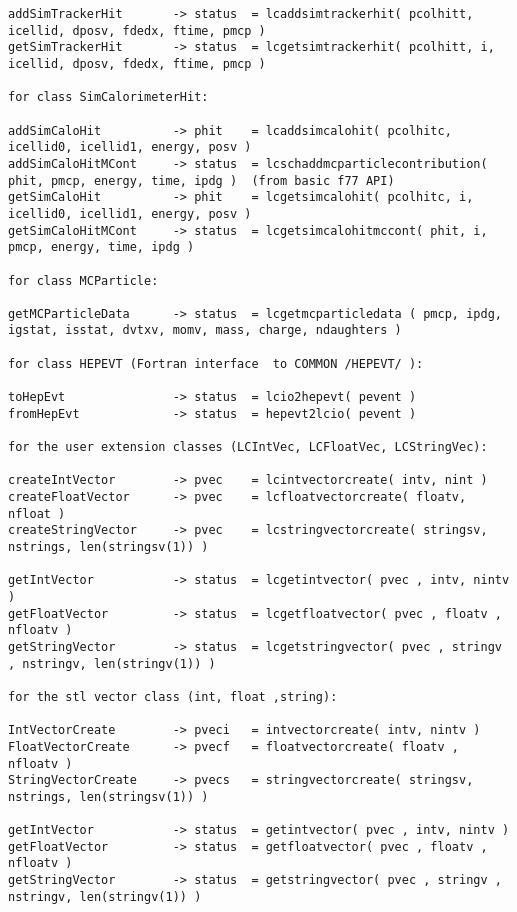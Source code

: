 \begin{scriptsize}
\begin{verbatim}
addSimTrackerHit       -> status  = lcaddsimtrackerhit( pcolhitt, icellid, dposv, fdedx, ftime, pmcp )
getSimTrackerHit       -> status  = lcgetsimtrackerhit( pcolhitt, i, icellid, dposv, fdedx, ftime, pmcp )

for class SimCalorimeterHit:

addSimCaloHit          -> phit    = lcaddsimcalohit( pcolhitc, icellid0, icellid1, energy, posv )
addSimCaloHitMCont     -> status  = lcschaddmcparticlecontribution( phit, pmcp, energy, time, ipdg )  (from basic f77 API)
getSimCaloHit          -> phit    = lcgetsimcalohit( pcolhitc, i, icellid0, icellid1, energy, posv )
getSimCaloHitMCont     -> status  = lcgetsimcalohitmccont( phit, i, pmcp, energy, time, ipdg )

for class MCParticle:

getMCParticleData      -> status  = lcgetmcparticledata ( pmcp, ipdg, igstat, isstat, dvtxv, momv, mass, charge, ndaughters )

for class HEPEVT (Fortran interface  to COMMON /HEPEVT/ ):

toHepEvt               -> status  = lcio2hepevt( pevent )
fromHepEvt             -> status  = hepevt2lcio( pevent )

for the user extension classes (LCIntVec, LCFloatVec, LCStringVec):

createIntVector        -> pvec    = lcintvectorcreate( intv, nint )
createFloatVector      -> pvec    = lcfloatvectorcreate( floatv, nfloat )
createStringVector     -> pvec    = lcstringvectorcreate( stringsv, nstrings, len(stringsv(1)) )

getIntVector           -> status  = lcgetintvector( pvec , intv, nintv )
getFloatVector         -> status  = lcgetfloatvector( pvec , floatv , nfloatv )
getStringVector        -> status  = lcgetstringvector( pvec , stringv , nstringv, len(stringv(1)) )

for the stl vector class (int, float ,string):

IntVectorCreate        -> pveci   = intvectorcreate( intv, nintv )
FloatVectorCreate      -> pvecf   = floatvectorcreate( floatv , nfloatv )
StringVectorCreate     -> pvecs   = stringvectorcreate( stringsv, nstrings, len(stringsv(1)) )

getIntVector           -> status  = getintvector( pvec , intv, nintv )
getFloatVector         -> status  = getfloatvector( pvec , floatv , nfloatv )
getStringVector        -> status  = getstringvector( pvec , stringv , nstringv, len(stringv(1)) )
\end{verbatim}

\end{scriptsize}


